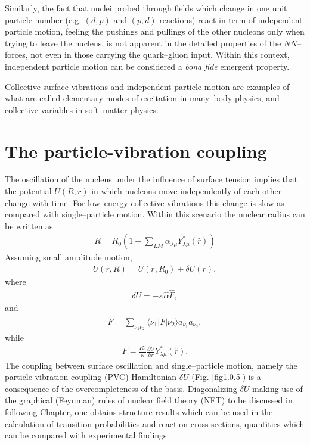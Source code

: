 \documentclass[a4paper,11pt]{book}
\numberwithin{equation}{section}
\numberwithin{figure}{section}
\numberwithin{table}{section}
\newcommand{\ket}[1]{|{#1} \rangle }
\newcommand{\bra}[1]{\langle {#1}|}
\begin{document}
Similarly, the fact that nuclei probed through fields which change in one unit particle number (e.g. $(d,p)$ and $(p,d)$ reactions) react in term of independent particle motion,  feeling the pushings and pullings of the other nucleons only when trying to leave the nucleus, is not apparent in the detailed properties of the $NN$--forces, not even in those carrying the quark--gluon input. Within this context, independent particle motion can be considered a \textit{bona fide} emergent property.


Collective surface vibrations and independent particle motion are examples of what are called elementary modes of excitation in many--body physics, and collective variables in soft--matter physics.

\section{The particle-vibration coupling}
The oscillation of the nucleus under the influence of surface tension implies that the potential $U(R,r)$ in which nucleons move independently of each other change with time. For low--energy collective vibrations this change is slow as compared with single--particle motion. Within this scenario the nuclear radius can be written as  
\begin{align}\label{eq1.0.12}
R=R_0\left(1+\sum_{LM}\alpha_{\lambda\mu}Y_{\lambda\mu}^*(\hat r)\right)
\end{align}
Assuming small amplitude motion,
\begin{align}\label{eq1.0.13}
U(r,R)=U(r,R_0)+\delta U(r),
\end{align}
where
\begin{align}\label{eq1.0.14}
\delta U=-\kappa\hat \alpha \hat F,
\end{align}
and
\begin{align}\label{eq1.0.15}
\hat F=\sum_{\nu_1\nu_2}\bra{\nu_1}F\ket{\nu_2}a_{\nu_1}^\dagger a_{\nu_2},
\end{align}
while
\begin{align}\label{eq1.0.16}
F=\frac{R_0}{\kappa}\frac{\partial U}{\partial r}Y^*_{\lambda\mu}(\hat r).
\end{align}
The coupling between surface oscillation and single--particle motion, namely the particle vibration coupling (PVC) Hamiltonian $\delta U$ (Fig. \ref{fig1.0.5}) is a consequence of the overcompleteness of the basis. Diagonalizing $\delta U$ making use of the graphical (Feynman) rules of nuclear field theory (NFT) to be discussed in following Chapter, one obtains structure results which can be used in the calculation of transition probabilities and reaction cross sections, quantities which can be compared with experimental findings.
\end{document}
